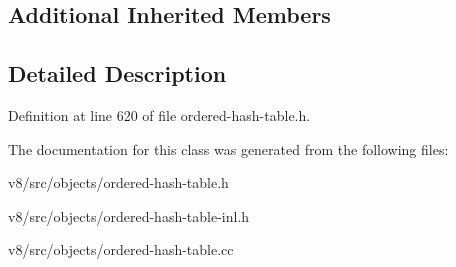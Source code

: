 \subsection*{Additional Inherited Members}


\subsection{Detailed Description}


Definition at line 620 of file ordered-\/hash-\/table.\+h.



The documentation for this class was generated from the following files\+:\begin{DoxyCompactItemize}
\item 
v8/src/objects/ordered-\/hash-\/table.\+h\item 
v8/src/objects/ordered-\/hash-\/table-\/inl.\+h\item 
v8/src/objects/ordered-\/hash-\/table.\+cc\end{DoxyCompactItemize}
